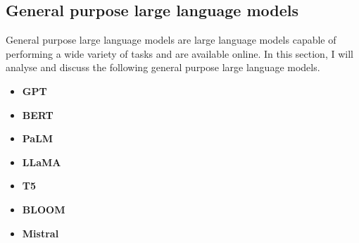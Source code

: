 \newpage
\subsection{General purpose large language models}
General purpose large language models are large language models capable of performing a wide variety of tasks and are available online. In this section, I will analyse and discuss the following general purpose large language models.
\begin{itemize}
    \item \textbf{GPT}
    \item \textbf{BERT}

    \item \textbf{PaLM}

    \item \textbf{LLaMA}

    \item \textbf{T5}
    
    \item \textbf{BLOOM}

    \item \textbf{Mistral}
\end{itemize}

